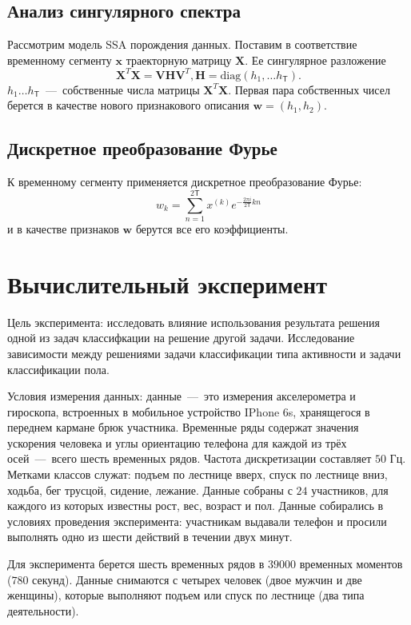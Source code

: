 \documentclass[12pt, twoside]{article}
\begin{document}
\subsection{ Анализ сингулярного спектра}
Рассмотрим модель SSA порождения данных. Поставим в соответствие временному сегменту $\mathbf{x}$ траекторную матрицу $\mathbf{X}$. Ее сингулярное разложение 
$$\mathbf{X}^T\mathbf{X}=\mathbf{V}\mathbf{H}\mathbf{V}^T, \mathbf{H} = \text{diag}(h_1,\ldots h_\mathsf{T}).$$ 
$h_1\ldots h_\mathsf{T}$~---~собственные числа матрицы $\mathbf{X}^T\mathbf{X}$. Первая пара собственных чисел берется в качестве нового признакового описания $\mathbf{w}=(h_1,h_2)$.  

\subsection{ Дискретное преобразование Фурье}
К временному сегменту применяется дискретное преобразование Фурье:
$$w_k = \sum\limits_{n=1}^{2\mathsf{T}}x^{(k)}e^{-\frac{2\pi i}{2\mathsf{T}}kn}$$
и в качестве признаков $\mathbf{w}$ берутся все его коэффициенты.


\section{Вычислительный эксперимент}

Цель эксперимента: исследовать влияние использования результата решения одной из задач классифкации на решение другой задачи. Исследование зависимости между решениями задачи классификации типа активности и задачи классификации пола.

Условия измерения данных: данные~---~это измерения акселерометра и гироскопа, встроенных в мобильное устройство IPhone 6s, хранящегося в переднем кармане брюк участника. Временные ряды содержат значения ускорения человека и углы ориентацию телефона для каждой из трёх осей~---~всего шесть временных рядов. Частота дискретизации составляет $50$ Гц. Метками классов служат: подъем по лестнице вверх, спуск по лестнице вниз, ходьба, бег трусцой, сидение, лежание. Данные собраны с $24$ участников, для каждого из  которых известны рост, вес, возраст и пол. Данные собирались в условиях проведения эксперимента: участникам выдавали телефон и просили выполнять одно из шести действий в течении двух минут.

Для эксперимента берется шесть временных рядов в $39000$ временных моментов ($780$ секунд). Данные снимаются с четырех человек (двое мужчин и две женщины), которые выполняют подъем или спуск по лестнице (два типа деятельности).
\end{document}
